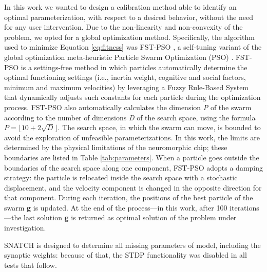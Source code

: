 \documentclass[utf8]{frontiersFPHY} %
\begin{document}
In this work we wanted to design a calibration method able to identify an optimal parameterization, with respect to a desired behavior, without the need for any user intervention. 
Due to the non-linearity and non-convexity of the problem, we opted for a global optimization method. Specifically, the algorithm used to minimize Equation \ref{eq:fitness} was FST-PSO \cite{Nobile2018}, a self-tuning variant of the global optimization meta-heuristic Particle Swarm Optimization (PSO) \cite{Kennedy1995}.
FST-PSO is a settings-free method in which particles automatically determine the optimal functioning settings (i.e., inertia weight, cognitive and social factors, minimum and maximum velocities) by leveraging a Fuzzy Rule-Based System that dynamically adjusts such constants for each particle during the optimization process. 
FST-PSO also automatically calculates the dimension \textit{P} of the swarm according to the number of dimensions \textit{D} of the search space, using the formula $\textit{P} = \lfloor 10 + 2\sqrt{\textit{D}}\rfloor$. 
The search space, in which the swarm can move, is bounded to avoid the exploration of unfeasible parameterizations.
In this work, the limits are determined by the physical limitations of the neuromorphic chip; these boundaries are listed in Table \ref{tab:parameters}.
When a particle goes outside the boundaries of the search space along one component, FST-PSO adopts  a damping strategy: the particle is relocated inside the search space with a stochastic displacement, and the velocity component is changed in the opposite direction for that component. 
During each iteration, the positions of the best particle of the swarm \textbf{g} is updated.
At the end of the process---in this work, after 100 iterations---the last solution \textbf{g} is returned as optimal solution of the problem under investigation.

SNATCH is designed to determine all missing parameters of model, including the synaptic weights: because of that, the STDP functionality was disabled in all tests that follow.
\end{document}
